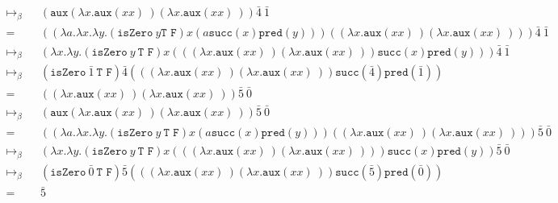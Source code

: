 \documentclass[11pt]{article}
\begin{document}
\begin{enumerate}
\begin{align*}
		\mapsto_\beta && ( \texttt{aux}( \lambda x. \texttt{aux}(x x) \:)( \lambda x. \texttt{aux}(x x) \:)) \bar{4} \: \bar{1} 	&\\
		= && (( \lambda a. \lambda x. \lambda y. ( \texttt{isZero} \: y \texttt{T F}) x (a \texttt{succ}(x) \texttt{pred}(y)))(( \lambda x. \texttt{aux}(x x) \:)( \lambda x. \texttt{aux}(x x) \:))) \bar{4} \: \bar{1} &\\
		\mapsto_\beta && ( \lambda x. \lambda y. ( \texttt{isZero} \: y \: \texttt{T F}) x ((( \lambda x. \texttt{aux}(x x) \:)( \lambda x. \texttt{aux}(x x) \:)) \texttt{succ}(x) \texttt{pred}(y))) \bar{4} \: \bar{1} &\\
		\mapsto_\beta && ( \texttt{isZero} \: \bar{1} \: \texttt{T F}) \bar{4} ((( \lambda x. \texttt{aux}(x x) \:)( \lambda x. \texttt{aux}(x x) \:)) \texttt{succ}( \bar{4} ) \texttt{pred}( \bar{1} )) &\\
		= && (( \lambda x. \texttt{aux}(x x) \:)( \lambda x. \texttt{aux}(x x) \:)) \bar{5} \: \bar{0} &\\
		\mapsto_\beta && ( \texttt{aux}( \lambda x. \texttt{aux}(x x) \:)( \lambda x. \texttt{aux}(x x) \:)) \bar{5} \: \bar{0} &\\
		= && (( \lambda a. \lambda x. \lambda y. ( \texttt{isZero} \: y \: \texttt{T F}) x ( a \texttt{succ}(x) \texttt{pred}(y)))(( \lambda x. \texttt{aux}(x x) \:)( \lambda x. \texttt{aux}(x x) \:))) \bar{5} \: \bar{0} &\\
		\mapsto_\beta && ( \lambda x. \lambda y. ( \texttt{isZero} \: y \: \texttt{T F}) x ((( \lambda x. \texttt{aux}(x x) \:)( \lambda x. \texttt{aux}(x x) \:))) \texttt{succ}(x) \texttt{pred}(y)) \bar{5} \: \bar{0} &\\
		\mapsto_\beta && ( \texttt{isZero} \: \bar{0}  \: \texttt{T F}) \bar{5} ((( \lambda x. \texttt{aux}(x x) \:)( \lambda x. \texttt{aux}(x x) \:)) \texttt{succ}( \bar{5} ) \texttt{pred}( \bar{0} )) &\\
		= && \bar{5}
		\end{align*}
\end{enumerate}
\end{document}
